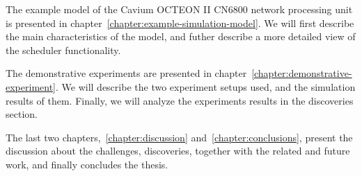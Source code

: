 The example model of the Cavium OCTEON II CN6800 network processing unit is presented in chapter~\ref{chapter:example-simulation-model}. We will first describe the main characteristics of the model, and futher describe a more detailed view of the scheduler functionality.

The demonstrative experiments are presented in chapter~\ref{chapter:demonstrative-experiment}. We will describe the two experiment setups used, and the simulation results of them. Finally, we will analyze the experiments results in the discoveries section.

The last two chapters,~\ref{chapter:discussion} and~\ref{chapter:conclusions}, present the discussion about the challenges, discoveries, together with the related and future work, and finally concludes the thesis.

